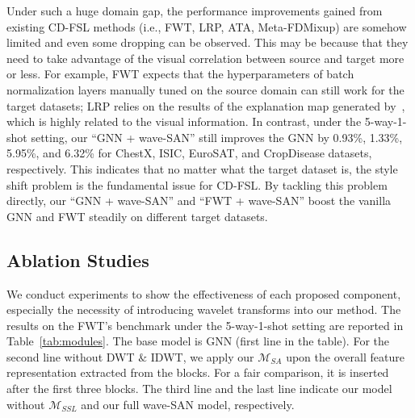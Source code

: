 \documentclass{article}
\begin{document}
Under such a huge domain gap, the performance improvements gained from existing CD-FSL methods (i.e., FWT, LRP, ATA, Meta-FDMixup) 
are somehow limited and even some dropping can be observed. This may be because that they need to take advantage of the visual correlation between source and target more or less. For example, FWT expects that the hyperparameters of batch normalization layers manually tuned on the source domain can still work for the target datasets; LRP relies on the results of the explanation map generated by~\cite{bach2015pixel}, which is highly related to the visual information. 
In contrast, under the 5-way-1-shot setting, our ``GNN + wave-SAN'' still improves the GNN by 0.93\%, 1.33\%, 5.95\%, and 6.32\% for ChestX, ISIC, EuroSAT, and CropDisease datasets, respectively. This indicates that no matter what the target dataset is, the style shift problem is the fundamental issue for CD-FSL. By tackling this problem directly, our ``GNN + wave-SAN'' and ``FWT + wave-SAN'' boost the vanilla GNN and FWT steadily on different target datasets.



\subsection{Ablation Studies}
We conduct experiments to show the effectiveness of each proposed component, especially the necessity of introducing wavelet transforms into our method. The results on the FWT's benchmark under the 5-way-1-shot setting are reported in Table~\ref{tab:modules}. The base model is GNN (first line in the table). For the second line without DWT $\&$ IDWT, we apply our $\mathcal{M}_{SA}$ upon the overall feature representation extracted from the blocks. For a fair comparison, it is inserted after the first three blocks. The third line and the last line indicate our model without $\mathcal{M}_{SSL}$ and our full wave-SAN model, respectively.
\end{document}
